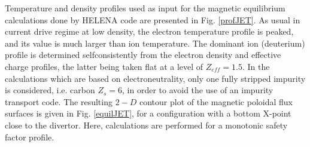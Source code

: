 

Temperature and density profiles used as input for the magnetic equilibrium
calculations done by HELENA code are presented in Fig. \ref{profJET}. As
usual in current drive regime at low density, the electron temperature
profile is peaked, and its value is much larger than ion temperature. The
dominant ion (deuterium) profile is determined selfconsistently from the
electron density and effective charge profiles, the latter being taken flat
at a level of $Z_{eff}=1.5$. In the calculations which are based on
electroneutrality, only one fully stripped impurity is considered, i.e.
carbon $Z_{s}=6$, in order to avoid the use of an impurity transport code.
The resulting $2-D$ contour plot of the magnetic poloidal flux surfaces is
given in Fig. \ref{equilJET}, for a configuration with a bottom X-point
close to the divertor. Here, calculations are performed for a monotonic
safety factor profile.


